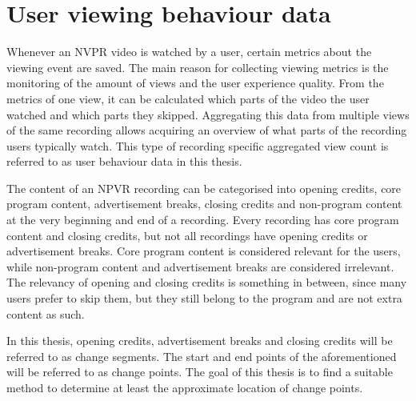 \section{User viewing behaviour data} \label{sec:data} %

Whenever an NVPR video is watched by a user, certain metrics about the viewing event are saved. The main reason for collecting viewing metrics is the monitoring of the amount of views and the user experience quality. From the metrics of one view, it can be calculated which parts of the video the user watched and which parts they skipped. Aggregating this data from multiple views of the same recording allows acquiring an overview of what parts of the recording users typically watch. This type of recording specific aggregated view count is referred to as user behaviour data in this thesis.

The content of an NPVR recording %
can be categorised into opening credits, core program content, advertisement breaks, closing credits and non-program content at the very beginning and end of a recording. Every recording has core program content and closing credits, but not all recordings have opening credits or advertisement breaks. Core program content is considered relevant for the users, while non-program content and advertisement breaks are considered irrelevant. The relevancy of opening and closing credits is something in between, since many users prefer to skip them, but they still belong to the program and are not extra content as such.

In this thesis, opening credits, advertisement breaks and closing credits will be referred to as change segments. The start and end points of the aforementioned will be referred to as change points. The goal of this thesis is to find a suitable method to determine at least the approximate location of change points.

